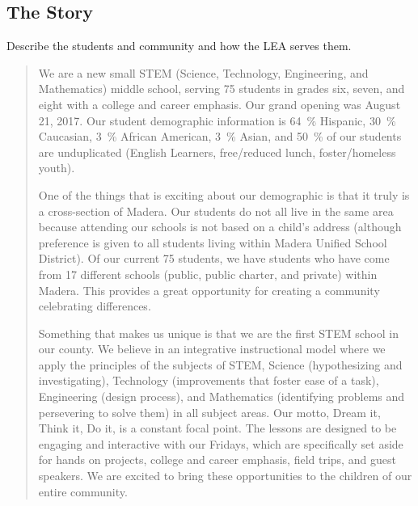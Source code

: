 \documentclass{article}
\begin{document}
\subsection{The Story}
Describe the students and community and how the LEA serves them.
\begin{quote}
	We are a new small STEM (Science, Technology, Engineering, and Mathematics) middle school, serving 75 students in grades six, seven, and eight with a college and career emphasis. Our grand opening was August 21, 2017. Our student demographic information is \SI{64}{\percent} Hispanic, \SI{30}{\percent} Caucasian, \SI{3}{\percent} African American, \SI{3}{\percent} Asian, and \SI{50}{\percent} of our students are unduplicated (English Learners, free/reduced lunch, foster/homeless youth).

	One of the things that is exciting about our demographic is that it truly is a cross-section of Madera. Our students do not all live in the same area because attending our schools is not based on a child's address (although preference is given to all students living within Madera Unified School District). Of our current 75 students, we have students who have come from 17 different schools (public, public charter, and private) within Madera. This provides a great opportunity for creating a community celebrating differences.

	Something that makes us unique is that we are the first STEM school in our county. We believe in an integrative instructional model where we apply the principles of the subjects of STEM, Science (hypothesizing and investigating), Technology (improvements that foster ease of a task), Engineering (design process), and Mathematics (identifying problems and persevering to solve them) in all subject areas. Our motto, Dream it, Think it, Do it, is a constant focal point. The lessons are designed to be engaging and interactive with our Fridays, which are specifically set aside for hands on projects, college and career emphasis, field trips, and guest speakers. We are excited to bring these opportunities to the children of our entire community.
\end{quote}
\end{document}

